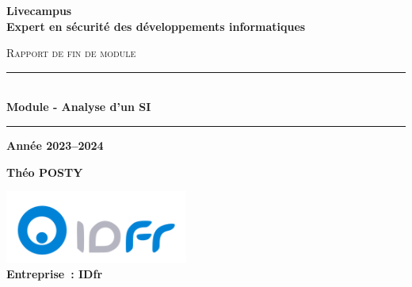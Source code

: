 \begin{titlepage}
    \begin{center}
       \vfill
       \begin{minipage}[c]{0.45\textwidth}
           \centering
       \end{minipage}
       \hfill
       \begin{minipage}[c]{0.45\textwidth}
       \end{minipage}
       \vfill
       \vspace{1.5cm}

       \textbf{\LARGE Livecampus}\\[0.3cm]
       \textbf{\Large Expert en sécurité des développements informatiques}

       \vspace{2cm}

       \textsc{\huge Rapport de fin de module}\\[1.2cm]

       \begin{center}
           \rule{\textwidth}{0.4mm}\\[0.4cm]
           \textbf{\Huge Module - Analyse d'un SI}
           \rule{\textwidth}{0.4mm}
       \end{center}

       \vspace{0.1cm}

       \textbf{\large Année 2023--2024}

       \vspace{1.6cm}

       \textbf{\Large Théo POSTY}

       \vspace{1.8cm}

       \includegraphics[width=0.45\textwidth]{images/logo/idfr.png}\\
       \textbf{\large Entreprise~: IDfr}

       \vspace{2.2cm}
       \vfill
    \end{center}
\end{titlepage}
